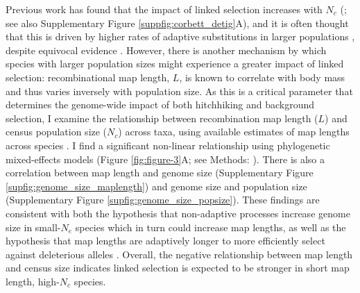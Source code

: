 \documentclass[11pt]{article}
\newcommand{\Newnameref}[1]{\textit{\nameref{#1}}}
\begin{document}
Previous work has found that the impact of linked selection increases with
$N_c$ (\cite{Corbett-Detig2015-gt}; see also Supplementary Figure
\ref{suppfig:corbett_detig}A), and it is often thought that this is driven by
higher rates of adaptive substitutions in larger populations
\parencite{Ohta1992-yi}, despite equivocal evidence \parencite{Galtier2016-dq}.
However, there is another mechanism by which species with larger population
sizes might experience a greater impact of linked selection: recombinational
map length, $L$, is known to correlate with body mass \parencite{Burt1987-tq}
and thus varies inversely with population size. As this is a critical parameter
that determines the genome-wide impact of both hitchhiking and background
selection, I examine the relationship between recombination map length ($L$)
and census population size ($N_c$) across taxa, using available estimates of
map lengths across species \parencite{Stapley2017-fs,Corbett-Detig2015-gt}. I
find a significant non-linear relationship using phylogenetic mixed-effects
models (Figure \ref{fig:figure-3}A; see Methods: \Newnameref{sec:methods-pcm}).
There is also a correlation between map length and genome size (Supplementary
Figure \ref{supfig:genome_size_maplength}) and genome size and population size
(Supplementary Figure \ref{supfig:genome_size_popsize}). These findings are
consistent with both the hypothesis that non-adaptive processes increase genome
size in small-$N_e$ species \parencite{Lynch2003-bn} which in turn could
increase map lengths, as well as the hypothesis that map lengths are adaptively
longer to more efficiently select against deleterious alleles
\parencite{Roze2021-ya}. Overall, the negative relationship between map length
and census size indicates linked selection is expected to be stronger in short
map length, high-$N_c$ species.
\end{document}
